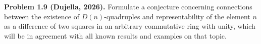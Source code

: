 \textbf{Problem 1.9 (Dujella, 2026).} Formulate a conjecture concerning connections between the existence of $D(n)$-quadruples and representability of the element $n$ as a difference of two squares in an arbitrary commutative ring with unity, which will be in agreement with all known results and examples on that topic.
